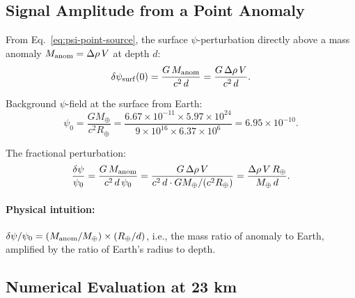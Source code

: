 \documentclass[aps,prd,twocolumn,superscriptaddress,nofootinbib]{revtex4-2}
\newcommand{\drho}{\Delta\rho}
\begin{document}
\subsection{Signal Amplitude from a Point Anomaly}

From Eq.~\eqref{eq:psi-point-source}, the surface $\psi$-perturbation
directly above a mass anomaly $M_{\rm anom} = \drho\,V$ at depth $d$:
\begin{equation}
  \delta\psi_{\rm surf}(0) = \frac{G\,M_{\rm anom}}{c^2\,d}
  = \frac{G\,\drho\,V}{c^2\,d}.
  \label{eq:signal-amplitude}
\end{equation}

Background $\psi$-field at the surface from Earth:
\begin{equation}
  \psi_0 = \frac{G M_\oplus}{c^2 R_\oplus}
  = \frac{6.67\times10^{-11}\times5.97\times10^{24}}
  {9\times10^{16}\times6.37\times10^6}
  = 6.95\times10^{-10}.
  \label{eq:psi0}
\end{equation}

The fractional perturbation:
\begin{equation}
  \frac{\delta\psi}{\psi_0} = \frac{G\,M_{\rm anom}}{c^2\,d\,\psi_0}
  = \frac{G\,\drho\,V}{c^2\,d \cdot G M_\oplus/(c^2 R_\oplus)}
  = \frac{\drho\,V\,R_\oplus}{M_\oplus\,d}.
  \label{eq:fractional}
\end{equation}

\paragraph{Physical intuition:} $\delta\psi/\psi_0 = (M_{\rm anom}/M_\oplus)
\times (R_\oplus/d)$, i.e., the mass ratio of anomaly to Earth,
amplified by the ratio of Earth's radius to depth.

\subsection{Numerical Evaluation at 23 km}
\end{document}
